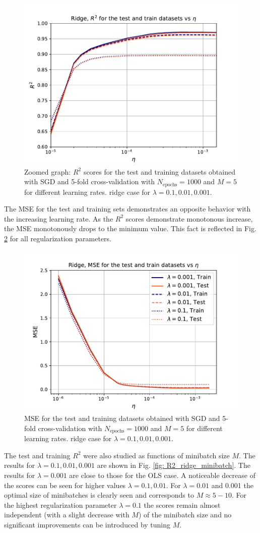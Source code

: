 \documentclass{emulateapj}
\begin{document}
\begin{figure}[!htb]
    \centering
    \includegraphics[width=.49\textwidth]{Figures/ridge_R2_eta_zoom.pdf}
    \caption{Zoomed graph: $R^2$ scores for the test and training datasets obtained with SGD and 5-fold cross-validation with $N_{\mathrm{epochs}}=1000$ and $M=5$ for different learning rates. ridge case for $\lambda=0.1,0.01,0.001$.}
    \label{fig: R2_ridge_eta_zoom}
\end{figure}

The MSE for the test and training sets demonstrates an opposite behavior with the increasing learning rate. As the $R^2$ scores demonstrate monotonous increase, the MSE monotonously drops to the minimum value. This fact is reflected in Fig. \ref{fig: MSE_ridge_eta} for all regularization parameters.

\begin{figure}[!htb]
    \centering
    \includegraphics[width=.49\textwidth]{Figures/ridge_MSE_eta.pdf}
    \caption{MSE for the test and training datasets obtained with SGD and 5-fold cross-validation with $N_{\mathrm{epochs}}=1000$ and $M=5$ for different learning rates. ridge case for $\lambda=0.1,0.01,0.001$.}
    \label{fig: MSE_ridge_eta}
\end{figure}

The test and training $R^2$ were also studied as functions of minibatch size $M$. The results for $\lambda=0.1,0.01,0.001$ are shown in Fig. \ref{fig: R2_ridge_minibatch}. The results for $\lambda=0.001$ are close to those for the OLS case. A noticeable decrease of the scores can be seen for higher values $\lambda=0.1,0.01$. For $\lambda=0.01$ and 0.001 the optimal size of minibatches is clearly seen and corresponds to $M\approx5-10$. For the highest regularization parameter $\lambda=0.1$ the scores remain almost independent (with a slight decrease with $M$) of the minibatch size and no significant improvements can be introduced by tuning $M$.
\end{document}
